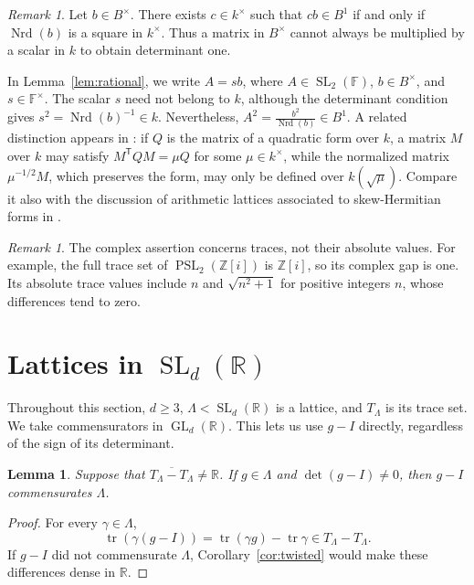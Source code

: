 \documentclass[reqno]{amsart}
\newtheorem{lemma}[theorem]{Lemma}
\theoremstyle{remark}
\newtheorem{remark}[theorem]{Remark}
\DeclareMathOperator{\tr}{tr}
\DeclareMathOperator{\Nrd}{Nrd}
\DeclareMathOperator{\GL}{GL}
\DeclareMathOperator{\SL}{SL}
\DeclareMathOperator{\PSL}{PSL}
\newcommand{\R}{\mathbb R}
\newcommand{\Z}{\mathbb Z}
\newcommand{\F}{\mathbb F}
\begin{document}
\begin{remark}\label{rem:lifts}
Let $b\in B^\times$. There exists $c\in k^\times$ such that $cb\in B^1$ if and only if $\Nrd(b)$ is a square in $k^\times$. Thus a matrix in $B^\times$ cannot always be multiplied by a scalar in $k$ to obtain determinant one.

In Lemma~\ref{lem:rational}, we write $A=sb$, where $A\in\SL_2(\F)$, $b\in B^\times$, and $s\in\F^\times$. The scalar $s$ need not belong to $k$, although the determinant condition gives $s^2=\Nrd(b)^{-1}\in k$. Nevertheless, $A^2=\frac{b^2}{\Nrd(b)}\in B^1$. A related distinction appears in \cite[\S3.1.2 and Lemma 3.10]{BBKS}: if $Q$ is the matrix of a quadratic form over $k$, a matrix $M$ over $k$ may satisfy $M^{\mathsf T}QM=\mu Q$ for some $\mu\in k^\times$, while the normalized matrix $\mu^{-1/2}M$, which preserves the form, may only be defined over $k(\sqrt{\mu})$. Compare it also with the discussion of arithmetic lattices associated to skew-Hermitian forms in \cite[Remark 4.7]{BBKS}.
\end{remark}

\begin{remark}
The complex assertion concerns traces, not their absolute values. For example, the full trace set of $\PSL_2(\Z[i])$ is $\Z[i]$, so its complex gap is one. Its absolute trace values include $n$ and $\sqrt{n^2+1}$ for positive integers $n$, whose differences tend to zero.
\end{remark}

\section{Lattices in \texorpdfstring{$\SL_d(\R)$}{SLd(R)}}\label{sec:sld}

Throughout this section, $d\ge3$, $\Lambda<\SL_d(\R)$ is a lattice, and $T_\Lambda$ is its trace set. We take commensurators in $\GL_d(\R)$. This lets us use $g-I$ directly, regardless of the sign of its determinant.

\begin{lemma}\label{lem:minusone}
Suppose that $\overline{T_\Lambda-T_\Lambda}\ne\R$. If $g\in\Lambda$ and $\det(g-I)\ne0$, then $g-I$ commensurates $\Lambda$.
\end{lemma}

\begin{proof}
For every $\gamma\in\Lambda$,
$$
\tr(\gamma(g-I))=\tr(\gamma g)-\tr\gamma\in T_\Lambda-T_\Lambda.
$$
If $g-I$ did not commensurate $\Lambda$, Corollary~\ref{cor:twisted} would make these differences dense in $\R$.
\end{proof}
\end{document}
